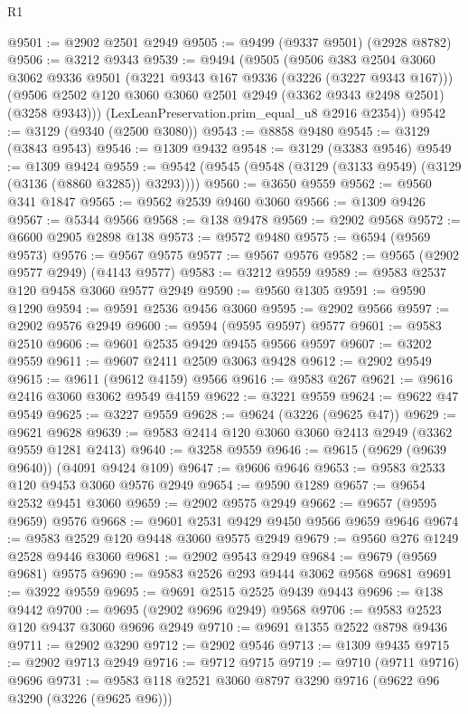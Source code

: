 \begin{lexlean}{R1}
\begin{coremodule}
@9501 := @2902 @2501 @2949
@9505 := @9499 (@9337 @9501) (@2928 @8782)
@9506 := @3212 @9343
@9539 := @9494
    (@9505
      (@9506
        @383
        @2504
        @3060
        @3062
        @9336
        @9501
        (@3221 @9343 @167 @9336 (@3226 (@3227 @9343 @167)))
        (@9506 @2502 @120 @3060 @3060 @2501 @2949 (@3362 @9343 @2498 @2501) (@3258 @9343)))
      (LexLeanPreservation.prim_equal_u8 @2916 @2354))
@9542 := @3129 (@9340 (@2500 @3080))
@9543 := @8858 @9480
@9545 := @3129 (@3843 @9543)
@9546 := @1309 @9432
@9548 := @3129 (@3383 @9546)
@9549 := @1309 @9424
@9559 := @9542 (@9545 (@9548 (@3129 (@3133 @9549) (@3129 (@3136 (@8860 @3285)) @3293))))
@9560 := @3650 @9559
@9562 := @9560 @341 @1847
@9565 := @9562 @2539 @9460 @3060
@9566 := @1309 @9426
@9567 := @5344 @9566
@9568 := @138 @9478
@9569 := @2902 @9568
@9572 := @6600 @2905 @2898 @138
@9573 := @9572 @9480
@9575 := @6594 (@9569 @9573)
@9576 := @9567 @9575
@9577 := @9567 @9576
@9582 := @9565 (@2902 @9577 @2949) (@4143 @9577)
@9583 := @3212 @9559
@9589 := @9583 @2537 @120 @9458 @3060 @9577 @2949
@9590 := @9560 @1305
@9591 := @9590 @1290
@9594 := @9591 @2536 @9456 @3060
@9595 := @2902 @9566
@9597 := @2902 @9576 @2949
@9600 := @9594 (@9595 @9597) @9577
@9601 := @9583 @2510
@9606 := @9601 @2535 @9429 @9455 @9566 @9597
@9607 := @3202 @9559
@9611 := @9607 @2411 @2509 @3063 @9428
@9612 := @2902 @9549
@9615 := @9611 (@9612 @4159) @9566
@9616 := @9583 @267
@9621 := @9616 @2416 @3060 @3062 @9549 @4159
@9622 := @3221 @9559
@9624 := @9622 @47 @9549
@9625 := @3227 @9559
@9628 := @9624 (@3226 (@9625 @47))
@9629 := @9621 @9628
@9639 := @9583 @2414 @120 @3060 @3060 @2413 @2949 (@3362 @9559 @1281 @2413)
@9640 := @3258 @9559
@9646 := @9615 (@9629 (@9639 @9640)) (@4091 @9424 @109)
@9647 := @9606 @9646
@9653 := @9583 @2533 @120 @9453 @3060 @9576 @2949
@9654 := @9590 @1289
@9657 := @9654 @2532 @9451 @3060
@9659 := @2902 @9575 @2949
@9662 := @9657 (@9595 @9659) @9576
@9668 := @9601 @2531 @9429 @9450 @9566 @9659 @9646
@9674 := @9583 @2529 @120 @9448 @3060 @9575 @2949
@9679 := @9560 @276 @1249 @2528 @9446 @3060
@9681 := @2902 @9543 @2949
@9684 := @9679 (@9569 @9681) @9575
@9690 := @9583 @2526 @293 @9444 @3062 @9568 @9681
@9691 := @3922 @9559
@9695 := @9691 @2515 @2525 @9439 @9443
@9696 := @138 @9442
@9700 := @9695 (@2902 @9696 @2949) @9568
@9706 := @9583 @2523 @120 @9437 @3060 @9696 @2949
@9710 := @9691 @1355 @2522 @8798 @9436
@9711 := @2902 @3290
@9712 := @2902 @9546
@9713 := @1309 @9435
@9715 := @2902 @9713 @2949
@9716 := @9712 @9715
@9719 := @9710 (@9711 @9716) @9696
@9731 := @9583 @118 @2521 @3060 @8797 @3290 @9716 (@9622 @96 @3290 (@3226 (@9625 @96)))

\end{coremodule}
\end{lexlean}

